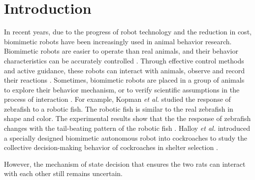 \section{Introduction}
In recent years, due to the progress of robot technology and the reduction in
cost, biomimetic robots have been increasingly used in animal behavior research.
Biomimetic robots are easier to operate than real animals, and their behavior
characteristics can be accurately controlled \cite{abdai_poking_the_futhre,
yeager_new_tech}. Through effective control methods and active guidance, these
robots can interact with animals, observe and record their reactions
\cite{son_entice_insect,Taylor2008frogs-17969,kopman_closed_loop_zebrafish,
partan_wild_tree,5650930}. Sometimes, biomimetic robots are placed in a group of
animals to explore their behavior mechanism, or to verify scientific assumptions
in the process of interaction \cite{doi:10.1126science.1144259,ward_quorum,
gribovskiy_mobile_robot,faria_novel_method}. For example, Kopman \textit{et al.}
studied the response of zebrafish to a robotic fish. The robotic fish is similar
to the real zebrafish in shape and color. The experimental results show that the
the response of zebrafish changes with the tail-beating pattern of the robotic
fish \cite{kopman_closed_loop_zebrafish}. Halloy \textit{et al.} introduced a
specially designed biomimetic autonomous robot into cockroaches to study the
collective decision-making behavior of cockroaches in shelter selection
\cite{doi:10.1126science.1144259}.

However, the mechanism
of state decision that ensures the two rats can interact with each other still
remains uncertain.

